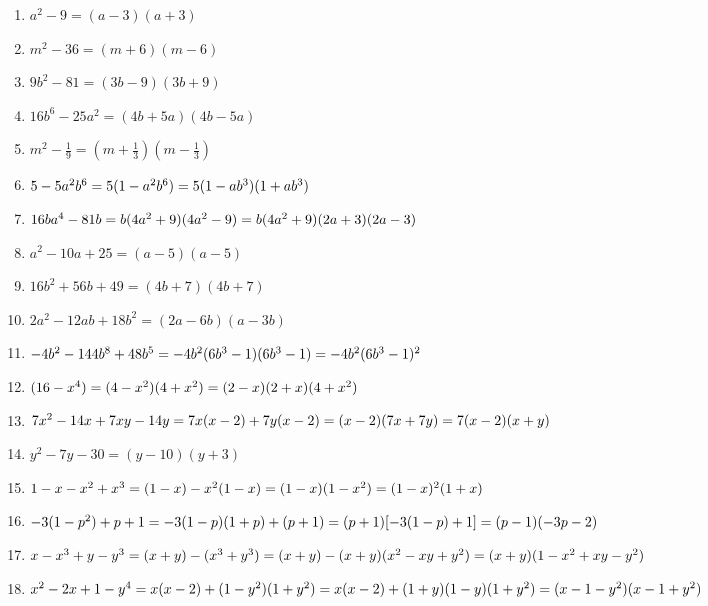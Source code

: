 \begin{eocsolutions}{}
{\begin{enumerate}[itemsep=6pt, label=\textbf{\arabic*}. ]
\begin{multicols}{2}
\begin{enumerate}[itemsep=5pt, label=\textbf{(\alph*)} ]
\item ${a}^{2}-9=(a - 3)(a + 3)$%
\item ${m}^{2}-36=(m + 6)(m - 6)$%
\item $9{b}^{2}-81=(3b - 9)(3b + 9)$%
\item $16{b}^{6}-25{a}^{2}=(4b + 5a)(4b - 5a)$%
\item ${m}^{2}-\frac{1}{9}=(m +\frac{1}{3})(m -\frac{1}{3})$%
\item $5-5{a}^{2}{b}^{6}\\=5(1-a^2b^6)\\=5(1 - ab^3)(1 + ab^3)$%
\item $16b{a}^{4}-81b\\=b(4a^2+9)(4a^2-9)\\=b(4a^2 + 9)(2a + 3)(2a - 3)$%
\item ${a}^{2}-10a+25=(a - 5)(a - 5)$%
\item $16{b}^{2}+56b+49=(4b + 7)(4b + 7)$%
\item $2{a}^{2}-12ab+18{b}^{2}=(2a - 6b)(a - 3b)$%
\item $-4{b}^{2}-144{b}^{8}+48{b}^{5}\\=-4b^2(6b^3 - 1)(6b^3 - 1)\\=-4b^2(6b^3 - 1)^2$%
\item $(16-{x}^{4})\\=(4-x^2)(4+x^2)\\=(2 - x)(2 + x)(4 + x^2)$%
\item ${7x}^{2}-14x+7xy-14y\\=7x(x-2)+7y(x-2)\\=(x-2)(7x+7y)\\=7(x - 2)(x + y)$%
\item ${y}^{2}-7y-30=(y - 10)(y + 3)$%
\item $1-x-{x}^{2}+{x}^{3}\\=(1-x)-x^2(1-x)\\=(1-x)(1-x^2)\\=(1 - x)^{2}(1 +x)$%
\item $-3(1-{p}^{2})+p+1\\ =-3(1-p)(1+p)+(p+1)\\=(p+1)[-3(1-p)+1]\\=(p - 1)(-3p-2)$%
\item $x-x^3+y-y^3\\=(x+y)-(x^3+y^3)\\=(x+y)-(x+y)(x^2-xy+y^2)\\=(x+y)(1-x^2+xy-y^2)$
\item $x^2-2x+1-y^4\\=x(x-2)+(1-y^2)(1+y^2)\\=x(x-2)+(1+y)(1-y)(1+y^2)\\=(x-1-y^2)(x-1+y^2)$

\end{enumerate}
\end{multicols}
\end{enumerate}}
\end{eocsolutions}
